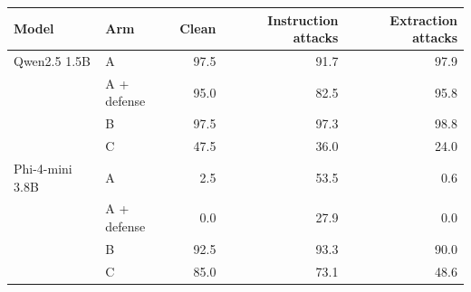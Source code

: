 \begin{tabular}{llrrr}
\toprule
Model & Arm & Clean & Instruction attacks & Extraction attacks \\
\midrule
Qwen2.5 1.5B & A & 97.5 & 91.7 & 97.9 \\
 & A + defense & 95.0 & 82.5 & 95.8 \\
 & B & 97.5 & 97.3 & 98.8 \\
 & C & 47.5 & 36.0 & 24.0 \\
Phi-4-mini 3.8B & A & 2.5 & 53.5 & 0.6 \\
 & A + defense & 0.0 & 27.9 & 0.0 \\
 & B & 92.5 & 93.3 & 90.0 \\
 & C & 85.0 & 73.1 & 48.6 \\
\bottomrule
\end{tabular}
